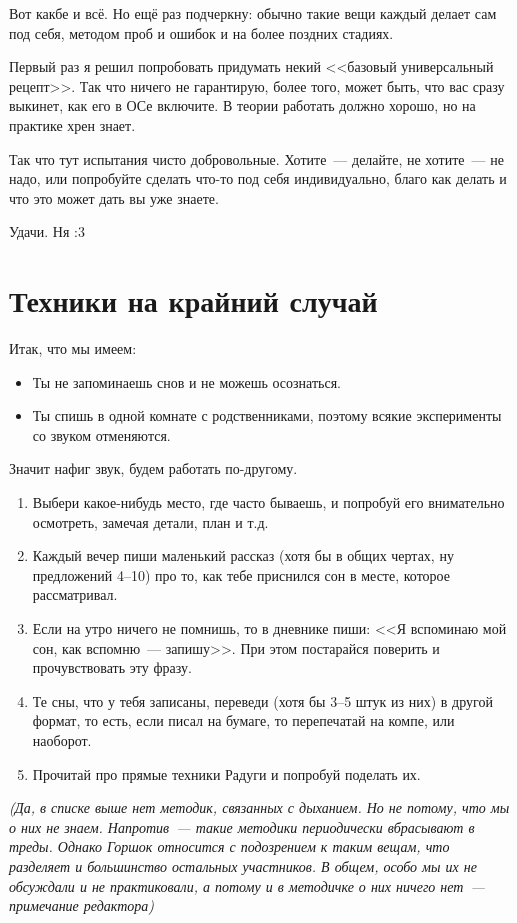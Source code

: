 \documentclass[a4paper,14pt,oneside]{memoir}
\begin{document}
Вот какбе и всё. Но ещё раз подчеркну: обычно такие вещи каждый делает сам под себя, методом проб и ошибок и на более поздних стадиях. 

Первый раз я решил попробовать придумать некий <<базовый универсальный рецепт>>. Так что ничего не гарантирую, более того, может быть, что вас сразу выкинет, как его в ОСе включите. В теории работать должно хорошо, но на практике хрен знает.

Так что тут испытания чисто добровольные. Хотите~--- делайте, не хотите~--- не надо, или попробуйте сделать что-то под себя индивидуально, благо как делать и что это может дать вы уже знаете. 

Удачи. Ня :3 



\chapter{Техники на крайний случай}
Итак, что мы имеем:
\begin{itemize}
\item Ты не запоминаешь снов и не можешь осознаться.
\item Ты спишь в одной комнате с родственниками, поэтому всякие эксперименты со звуком отменяются.
\end{itemize}

Значит нафиг звук, будем работать по-другому. 

\begin{enumerate}
\item Выбери какое-нибудь место, где часто бываешь, и попробуй его внимательно осмотреть, замечая детали, план и т.д.
\item Каждый вечер пиши маленький рассказ (хотя бы в общих чертах, ну предложений 4--10) про то, как тебе приснился сон в месте, которое рассматривал.
\item Если на утро ничего не помнишь, то в дневнике пиши: <<Я вспоминаю мой сон, как вспомню~--- запишу>>. При этом постарайся поверить и прочувствовать эту фразу. 
\item Те сны, что у тебя записаны, переведи (хотя бы 3--5 штук из них) в другой формат, то есть, если писал на бумаге, то перепечатай на компе, или наоборот. 
\item Прочитай про прямые техники Радуги и попробуй поделать их.
\end{enumerate} %


\textit{(Да, в списке выше нет методик, связанных с дыханием. Но не потому, что мы о них не знаем. Напротив~--- такие методики периодически вбрасывают в треды. Однако Горшок относится с подозрением к таким вещам, что разделяет и большинство остальных участников. В общем, особо мы их не обсуждали и не практиковали, а потому и в методичке о них ничего нет~---примечание редактора)}
\end{document}
